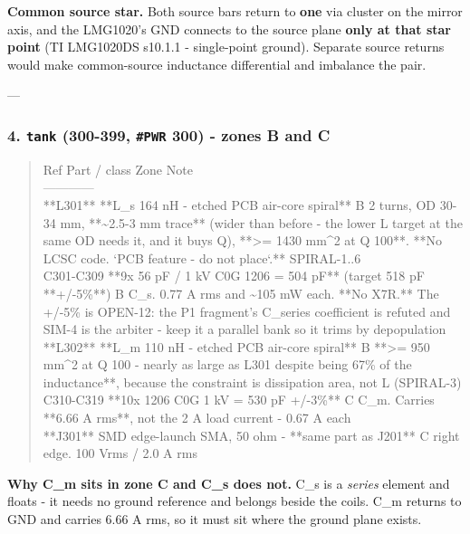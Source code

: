\documentclass[11pt,a4paper]{article}
\begin{document}
\textbf{Common source star.} Both source bars return to \textbf{one} via cluster on the mirror axis, and the LMG1020's GND connects to the source plane \textbf{only at that star point} (TI LMG1020DS s10.1.1 - single-point ground). Separate source returns would make common-source inductance differential and imbalance the pair.

---

\subsubsection*{4. \texttt{tank} (300-399, \texttt{\#PWR} 300) - zones B and C}
\begin{quote}\small\ttfamily\raggedright
\textbar{} Ref \textbar{} Part / class \textbar{} Zone \textbar{} Note \textbar{}\\
\textbar{}---\textbar{}---\textbar{}---\textbar{}---\textbar{}\\
\textbar{} {*}{*}L301{*}{*} \textbar{} {*}{*}L\_s 164 nH - etched PCB air-core spiral{*}{*} \textbar{} B \textbar{} 2 turns, OD 30-34 mm, {*}{*}\textasciitilde{}2.5-3 mm trace{*}{*} (wider than before - the lower L target at the same OD needs it, and it buys Q), {*}{*}\textgreater{}= 1430 mm\textasciicircum{}2 at Q 100{*}{*}. {*}{*}No LCSC code. `PCB feature - do not place`.{*}{*} SPIRAL-1..6 \textbar{}\\
\textbar{} C301-C309 \textbar{} {*}{*}9x 56 pF / 1 kV C0G 1206 = 504 pF{*}{*} (target 518 pF {*}{*}+/-5\%{*}{*}) \textbar{} B \textbar{} C\_s. 0.77 A rms and \textasciitilde{}105 mW each. {*}{*}No X7R.{*}{*} The +/-5\% is OPEN-12: the P1 fragment's C\_series coefficient is refuted and SIM-4 is the arbiter - keep it a parallel bank so it trims by depopulation \textbar{}\\
\textbar{} {*}{*}L302{*}{*} \textbar{} {*}{*}L\_m 110 nH - etched PCB air-core spiral{*}{*} \textbar{} B \textbar{} {*}{*}\textgreater{}= 950 mm\textasciicircum{}2 at Q 100 - nearly as large as L301 despite being 67\% of the inductance{*}{*}, because the constraint is dissipation area, not L (SPIRAL-3) \textbar{}\\
\textbar{} C310-C319 \textbar{} {*}{*}10x 1206 C0G 1 kV = 530 pF +/-3\%{*}{*} \textbar{} C \textbar{} C\_m. Carries {*}{*}6.66 A rms{*}{*}, not the 2 A load current - 0.67 A each \textbar{}\\
\textbar{} {*}{*}J301{*}{*} \textbar{} SMD edge-launch SMA, 50 ohm - {*}{*}same part as J201{*}{*} \textbar{} C \textbar{} right edge. 100 Vrms / 2.0 A rms \textbar{}
\end{quote}
\textbf{Why C\_m sits in zone C and C\_s does not.} C\_s is a \emph{series} element and floats - it needs no ground reference and belongs beside the coils. C\_m returns to GND and carries 6.66 A rms, so it must sit where the ground plane exists.
\end{document}
